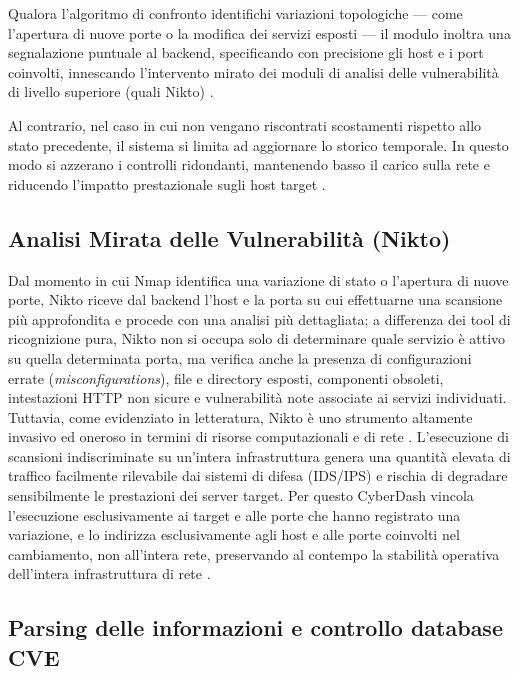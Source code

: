 \documentclass{article}
\begin{document}
Qualora l'algoritmo di confronto identifichi variazioni topologiche — come l'apertura di nuove porte o la modifica dei servizi esposti — il modulo inoltra una segnalazione puntuale al backend, specificando con precisione gli host e i port coinvolti, innescando l'intervento mirato dei moduli di analisi delle vulnerabilità di livello superiore (quali Nikto) \cite{gajula_evaluating_2024}. 

Al contrario, nel caso in cui non vengano riscontrati scostamenti rispetto allo stato precedente, il sistema si limita ad aggiornare lo storico temporale. In questo modo si azzerano i controlli ridondanti, mantenendo basso il carico sulla rete e riducendo l'impatto prestazionale sugli host target \cite{jha_canvus_2010}.

\subsection{Analisi Mirata delle Vulnerabilità (Nikto)}
Dal momento in cui Nmap identifica una variazione di stato o l'apertura di nuove porte, Nikto riceve dal backend l'host e la porta su cui effettuarne una scansione più approfondita e procede con una analisi più dettagliata; a differenza dei tool di ricognizione pura, Nikto non si occupa solo di determinare quale servizio è attivo su quella determinata porta, ma verifica anche la presenza di configurazioni errate (\textit{misconfigurations}), file e directory esposti, componenti obsoleti, intestazioni HTTP non sicure e vulnerabilità note associate ai servizi individuati.
Tuttavia, come evidenziato in letteratura, Nikto è uno strumento altamente invasivo ed oneroso in termini di risorse computazionali e di rete \cite{gajula_evaluating_2024, samgir_automated_2024}.
L'esecuzione di scansioni indiscriminate su un'intera infrastruttura genera una quantità elevata di traffico facilmente rilevabile dai sistemi di difesa (IDS/IPS) e rischia di degradare sensibilmente le prestazioni dei server target. 
Per questo CyberDash vincola l'esecuzione esclusivamente ai target e alle porte che hanno registrato una variazione, e lo indirizza esclusivamente agli host e alle porte coinvolti nel cambiamento, non all’intera rete, preservando al contempo la stabilità operativa dell'intera infrastruttura di rete \cite{kumar_aipentool_2025}.




\subsection{Parsing delle informazioni e controllo database CVE}
\end{document}
